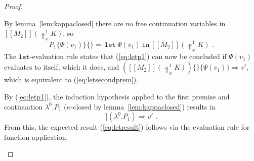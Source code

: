 \documentclass[a4paper,11pt,draft]{article}
\newcommand{\kw}[1]{\mathtt{#1}}
\begin{document}
\begin{proof}
\begin{description}
By lemma~\ref{lem:kappaclosed} there are no free continuation variables in
$[\![M_{2}]\!](\Uparrow_{x}^{1} K)$, so
\begin{equation*}
  P_{1}\{\Psi(v_{1})\}\{\} = \: \kw{let} \: \Psi(v_{1}) \: \kw{in} \: [\![M_{2}]\!](\Uparrow_{x}^{1} K) \text{ .}
\end{equation*}
The $\kw{let}$-evaluation rule states that (\ref{eq:letp1}) can now be concluded if
$\Psi(v_{1})$ evaluates to itself, which it does, and
$([\![M_{2}]\!](\Uparrow_{x}^{1} K))\{\}\{\Psi(v_{1})\} \Rightarrow v'$, which is
equivalent to (\ref{eq:letsecondprem}).

By (\ref{eq:letp1}), the induction hypothesis applied to the first premise and
continuation $\lambda^{0}.P_{1}$ ($\kappa$-closed by lemma~\ref{lem:kappaclosed})
results in
\begin{equation*}
  [\![M_{1}]\!](\lambda^{0}.P_{1}) \Rightarrow v' \text{ .}
\end{equation*}
From this, the expected result (\ref{eq:letresult}) follows via the evaluation rule for
function application.\qedhere
\end{description}
\end{proof}




\end{document}
